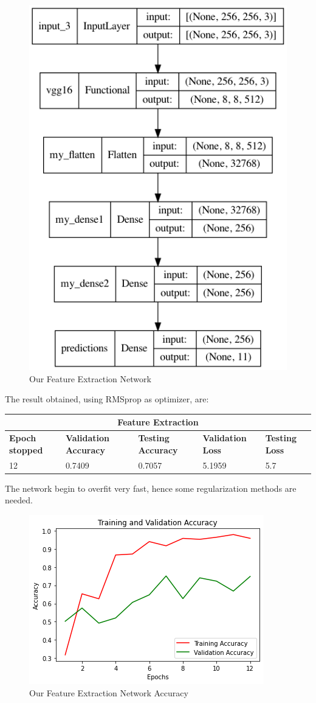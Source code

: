 \begin{figure}[H]
	\centering
	\includegraphics[height=0.5\textwidth]{img/vgg16/vgg16fe1.png}
	\caption{Our Feature Extraction Network}
	\label{fig:vgg16fe1}
\end{figure}


\noindent The result obtained, using RMSprop as optimizer, are:

\medskip

\begin{tabular}{ |p{2cm}|p{2cm}|p{2cm}|p{2cm}|p{2cm}|  }
\hline
\multicolumn{5}{|c|}{Feature Extraction} \\
\hline
\textbf{Epoch stopped} & \textbf{Validation Accuracy} & \textbf{Testing Accuracy} & \textbf{Validation Loss} & \textbf{Testing Loss} \\
\hline
12 & 0.7409 & 0.7057 & 5.1959 & 5.7\\
\hline
\end{tabular}

\medskip

 \noindent The network begin to overfit very fast, hence some regularization methods are needed.


\begin{figure}[H]
	\centering
	\includegraphics[height=0.45\textwidth]{img/vgg16/vgg16fe1acc.png}
	\caption{Our Feature Extraction Network Accuracy}
	\label{fig:vgg16fe1acc}
\end{figure}

